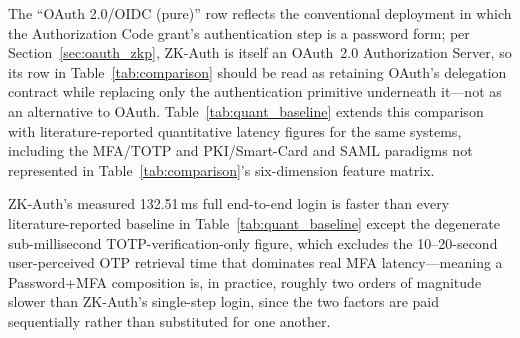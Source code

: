 \documentclass[journal,twoside,10pt]{IEEEtran}
\begin{document}
The ``OAuth 2.0/OIDC (pure)'' row reflects the conventional deployment in
which the Authorization Code grant's authentication step is a password
form; per Section~\ref{sec:oauth_zkp}, ZK-Auth is itself an OAuth~2.0
Authorization Server, so its row in Table~\ref{tab:comparison} should be
read as retaining OAuth's delegation contract while replacing only the
authentication primitive underneath it---not as an alternative to OAuth.
Table~\ref{tab:quant_baseline} extends this comparison with
literature-reported quantitative latency figures for the same systems,
including the MFA/TOTP and PKI/Smart-Card and SAML paradigms not
represented in Table~\ref{tab:comparison}'s six-dimension feature matrix.

\begin{table}[!t]
\renewcommand{\arraystretch}{1.2}
\caption{Consolidated Quantitative Baseline Comparison. ZK-Auth figures
are measured (Section~\ref{sec:results}); all other figures are
literature-reported.}
\label{tab:quant_baseline}
\centering
{}
\end{table}

ZK-Auth's measured 132.51\,ms full end-to-end login is faster than every
literature-reported baseline in Table~\ref{tab:quant_baseline} except the
degenerate sub-millisecond TOTP-verification-only figure, which excludes
the 10--20-second user-perceived OTP retrieval time that dominates real
MFA latency---meaning a Password+MFA composition is, in practice,
roughly two orders of magnitude slower than ZK-Auth's single-step login,
since the two factors are paid sequentially rather than substituted for
one another.
\end{document}
